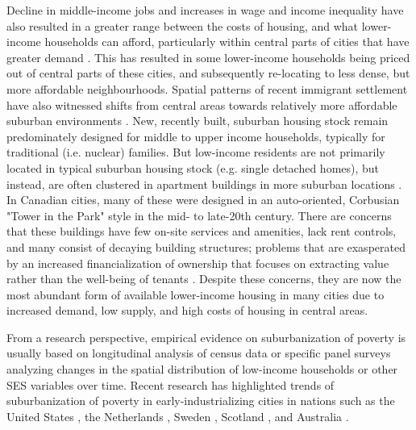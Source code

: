 Decline in middle-income jobs and increases in wage and income inequality have also resulted in a greater range between the costs of housing, and what lower-income households can afford, particularly within central parts of cities that have greater demand \cite{walks_social_2001}. This has resulted in some lower-income households being priced out of central parts of these cities, and subsequently re-locating to less dense, but more affordable neighbourhoods. Spatial patterns of recent immigrant settlement have also witnessed shifts from central areas towards relatively more affordable suburban environments \cite{ley_relations_2000}. New, recently built, suburban housing stock remain predominately designed for middle to upper income households, typically for traditional (i.e. nuclear) families. But low-income residents are not primarily located in typical suburban housing stock (e.g. single detached homes), but instead, are often clustered in apartment buildings in more suburban locations \cite{cooke_suburbanization_2015,skaburskis_filtering_2014}. In Canadian cities, many of these were designed in an auto-oriented, Corbusian "Tower in the Park" style in the mid- to late-20th century.  There are concerns that these buildings have few on-site services and amenities, lack rent controls, and many consist of decaying building structures; problems that are exasperated by an increased financialization of ownership that focuses on extracting value rather than the well-being of tenants \cite{august_gentrification_2018}. Despite these concerns, they are now the most abundant form of available lower-income housing in many cities due to increased demand, low supply, and high costs of housing in central areas.

From a research perspective, empirical evidence on suburbanization of poverty is usually based on longitudinal analysis of census data or specific panel surveys analyzing changes in the spatial distribution of low-income households or other SES variables over time. Recent research has highlighted trends of suburbanization of poverty in early-industrializing cities in nations such as the United States
\cite{kneebone_suburbanization_2010,howell_racial_2014,cooke_suburbanization_2015}, the Netherlands \cite{hochstenbach_gentrification_2018}, Sweden , Scotland \cite{kavanagh_is_2016}, and Australia \cite{randolph_suburbanizing_2014}.

